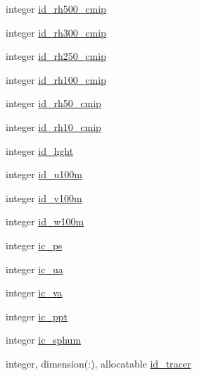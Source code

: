 \begin{DoxyCompactItemize}
\item 
integer \hyperlink{structfv__arrays__mod_1_1fv__diag__type_a613de64403c7ea723460d5d74d88b644}{id\-\_\-rh500\-\_\-cmip}
\item 
integer \hyperlink{structfv__arrays__mod_1_1fv__diag__type_a7e2379212d4724f6815ddc146d868936}{id\-\_\-rh300\-\_\-cmip}
\item 
integer \hyperlink{structfv__arrays__mod_1_1fv__diag__type_a2cd499f8ecb29eda6e01b76dc8828341}{id\-\_\-rh250\-\_\-cmip}
\item 
integer \hyperlink{structfv__arrays__mod_1_1fv__diag__type_ad58ec87b1ab423e16264571ce9c07cdc}{id\-\_\-rh100\-\_\-cmip}
\item 
integer \hyperlink{structfv__arrays__mod_1_1fv__diag__type_ad7e64434e809619ed820e7080da2d7ad}{id\-\_\-rh50\-\_\-cmip}
\item 
integer \hyperlink{structfv__arrays__mod_1_1fv__diag__type_ae9e3edf9bbdc6049bdc5b847e0449e28}{id\-\_\-rh10\-\_\-cmip}
\item 
integer \hyperlink{structfv__arrays__mod_1_1fv__diag__type_aed92d984c51120a8e1c0603c157b8c1b}{id\-\_\-hght}
\item 
integer \hyperlink{structfv__arrays__mod_1_1fv__diag__type_afa53aad1dc4de6f5309ebedeced85dc6}{id\-\_\-u100m}
\item 
integer \hyperlink{structfv__arrays__mod_1_1fv__diag__type_a7901dc1f4f2b261febf73e0064a0e703}{id\-\_\-v100m}
\item 
integer \hyperlink{structfv__arrays__mod_1_1fv__diag__type_af439389cd4e49830cde3a3c252e910e8}{id\-\_\-w100m}
\item 
integer \hyperlink{structfv__arrays__mod_1_1fv__diag__type_ad0bac6918677f1bcb0b8a02db3c15ba6}{ic\-\_\-ps}
\item 
integer \hyperlink{structfv__arrays__mod_1_1fv__diag__type_a54b1c4e81d0efba189d5a4ba22cc9586}{ic\-\_\-ua}
\item 
integer \hyperlink{structfv__arrays__mod_1_1fv__diag__type_a5d0238ef8c9714454fef513a0a142ad2}{ic\-\_\-va}
\item 
integer \hyperlink{structfv__arrays__mod_1_1fv__diag__type_a209a23364e9e3864fd62e3746e5530c5}{ic\-\_\-ppt}
\item 
integer \hyperlink{structfv__arrays__mod_1_1fv__diag__type_ab29a6be075c7645616d0ce9b1d2064b3}{ic\-\_\-sphum}
\item 
integer, dimension(\-:), allocatable \hyperlink{structfv__arrays__mod_1_1fv__diag__type_abf748df5449396c1a7074ecb74d7f324}{id\-\_\-tracer}
\item 

\end{DoxyCompactItemize}
